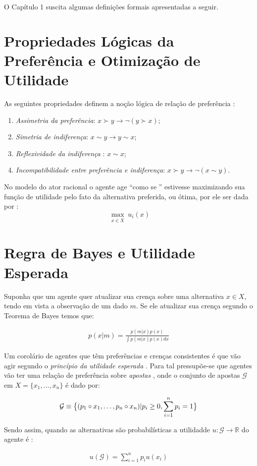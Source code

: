 O Capítulo 1 suscita algumas definições formais apresentadas a seguir.

\section*{Propriedades Lógicas da Preferência e Otimização de Utilidade}

 As seguintes propriedades definem a
noção lógica de relação de preferência \cite{sep-preferences}:

\begin{enumerate}
\item \textit{Assimetria da preferência}: \( x \succ y \to \neg (y \succ x )\); 
\item \textit{Simetria de indiferença}: \(x \sim y \to  y \sim x\); 
\item \textit{Reflexividade da indiferença }: \(x \sim x\); 
\item \textit{Incompatibilidade entre preferência e indiferença}: \(x \succ y \to \neg ( x
  \sim y)\).
\end{enumerate}


No modelo do ator racional o agente age ``como se '' estivesse maximizando sua
função de utilidade  pelo fato da alternativa
preferida, ou ótima, por ele ser dada por \cite{binmore2008rational}:
\[\max_{\substack{x \in  X}}
  u_i(x)
\]

\section*{Regra de Bayes e Utilidade Esperada}

Suponha que um agente quer atualizar sua crença
sobre uma alternativa \(x \in X\), tendo em vista a observação de um dado \(m\).
Se ele atualizar sua crença segundo o Teorema de Bayes temos
que:

\begin{align*}
  p(x|m) =
  \frac{p(m|x)
  p(x)}
  {\int p(m|x)
  p(x)
  dx}
\end{align*}


Um corolário de agentes que têm preferências e crenças consistentes é que vão
agir segundo o \textit{princípio da utilidade esperada}
\cite{sep-rationality-normative-utility}. Para tal pressupõe-se que agentes vão
ter uma relação de preferência sobre \textit{apostas} \cite{jehle2001advanced},
onde o conjunto de apostas \(\mathcal{G}\) em \(X = \{ x_1, \ldots, x_n \}\) é dado
por:

\begin{align*}
  \mathcal{G} \equiv \big{\{}
  (p_1 \circ x_1, \ldots, p_n \circ x_n  )
  | p_i \geq 0,
  \sum_{i = 1 }^n p_i
  = 1  \big{\}}  
\end{align*}

Sendo assim, quando as alternativas são probabilísticas a utilidadde \(u:
\mathcal{G} \to \mathbb{R} \) do agente é
\cite{jehle2001advanced,sep-rationality-normative-utility}:

\begin{align*}
  u(\mathcal{G}) = \sum_{i =1}^n p_i u(x_i)
\end{align*}